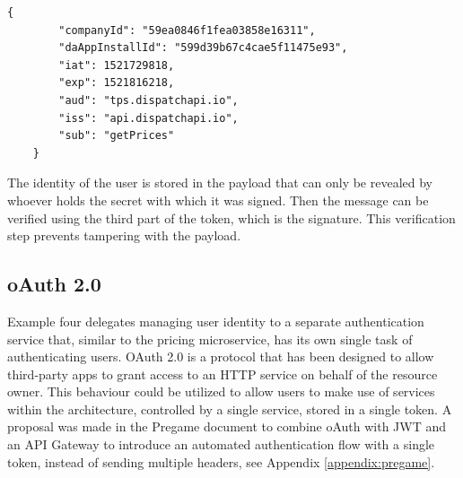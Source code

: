 \begin{Verbatim}[fontsize=\scriptsize]
	{
		"companyId": "59ea0846f1fea03858e16311",
		"daAppInstallId": "599d39b67c4cae5f11475e93",
		"iat": 1521729818,
		"exp": 1521816218,
		"aud": "tps.dispatchapi.io",
		"iss": "api.dispatchapi.io",
		"sub": "getPrices"
	}
\end{Verbatim}

The identity of the user is stored in the payload that can only be revealed by whoever holds the secret with which it was signed. Then the message can be verified using the third part of the token, which is the signature. This verification step prevents tampering with the payload.

\subsection{oAuth 2.0}
Example four delegates managing user identity to a separate authentication service that, similar to the pricing microservice, has its own single task of authenticating users. OAuth 2.0 is a protocol that has been designed to allow third-party apps to grant access to an HTTP service on behalf of the resource owner. This behaviour could be utilized to allow users to make use of services within the architecture, controlled by a single service, stored in a single token. A proposal was made in the Pregame document to combine oAuth with JWT and an API Gateway to introduce an automated authentication flow with a single token, instead of sending multiple headers, see Appendix \ref{appendix:pregame}.

